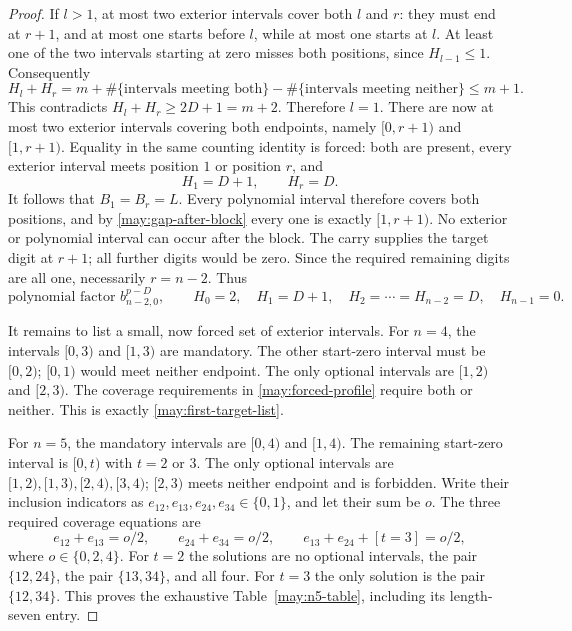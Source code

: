\begin{proof}
If $l>1$, at most two exterior intervals cover both $l$ and $r$: they
must end at $r+1$, and at most one starts before $l$, while at most one
starts at $l$.  At least one of the two intervals starting at zero
misses both positions, since $H_{l-1}\leq1$.  Consequently
\[
 H_l+H_r
 =m+\#\{\text{intervals meeting both}\}
       -\#\{\text{intervals meeting neither}\}
 \leq m+1.
\]
This contradicts $H_l+H_r\geq2D+1=m+2$.  Therefore $l=1$.
There are now at most two exterior intervals covering both endpoints,
namely $[0,r+1)$ and $[1,r+1)$.  Equality in the same counting identity
is forced: both are present, every exterior interval meets position $1$
or position $r$, and
\[
 H_1=D+1,\qquad H_r=D.
\]
It follows that $B_1=B_r=L$.  Every polynomial interval therefore covers
both positions, and by \eqref{may:gap-after-block} every one is exactly
$[1,r+1)$.  No exterior or polynomial interval can occur after the block.
The carry supplies the target digit at $r+1$; all further digits would
be zero.  Since the required remaining digits are all one, necessarily
$r=n-2$.  Thus
\begin{equation}
 \text{polynomial factor }b_{n-2,0}^{p-D},\qquad
 H_0=2,\quad H_1=D+1,\quad
 H_2=\cdots=H_{n-2}=D,
 \quad H_{n-1}=0.
 \label{may:forced-profile}
\end{equation}

It remains to list a small, now forced set of exterior intervals.
For $n=4$, the intervals $[0,3)$ and $[1,3)$ are mandatory.  The other
start-zero interval must be $[0,2)$; $[0,1)$ would meet neither endpoint.
The only optional intervals are $[1,2)$ and $[2,3)$.  The coverage
requirements in \eqref{may:forced-profile} require both or neither.
This is exactly \eqref{may:first-target-list}.

For $n=5$, the mandatory intervals are $[0,4)$ and $[1,4)$.
The remaining start-zero interval is $[0,t)$ with $t=2$ or $3$.
The only optional intervals are $[1,2),[1,3),[2,4),[3,4)$;
$[2,3)$ meets neither endpoint and is forbidden.  Write their inclusion
indicators as $e_{12},e_{13},e_{24},e_{34}\in\{0,1\}$, and let their
sum be $o$.  The three required coverage equations are
\begin{equation}
 e_{12}+e_{13}=o/2,\qquad
 e_{24}+e_{34}=o/2,\qquad
 e_{13}+e_{24}+[t=3]=o/2,
 \label{may:four-indicators}
\end{equation}
where $o\in\{0,2,4\}$.  For $t=2$ the solutions are no optional
intervals, the pair $\{12,24\}$, the pair $\{13,34\}$, and all four.
For $t=3$ the only solution is the pair $\{12,34\}$.  This proves the
exhaustive Table~\ref{may:n5-table}, including its length-seven entry.


\end{proof}
